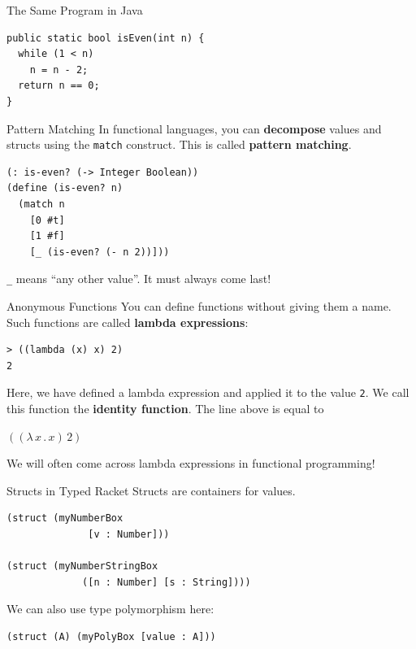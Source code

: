 \documentclass{beamer}
\begin{document}
\begin{frame}[fragile]{The Same Program in Java}
\begin{lstlisting}[style=Java]
public static bool isEven(int n) {
  while (1 < n)
    n = n - 2;
  return n == 0;
}
\end{lstlisting}
\end{frame}

\begin{frame}[fragile]{Pattern Matching}
In functional languages, you can \textbf{decompose} values and structs using the \lstinline{match} construct. This is called \textbf{pattern matching}.

\begin{lstlisting}
(: is-even? (-> Integer Boolean))
(define (is-even? n)
  (match n
    [0 #t]
    [1 #f]
    [_ (is-even? (- n 2))]))
\end{lstlisting}

\lstinline{_} means ``any other value''. It must always come last!
\end{frame}

\begin{frame}[fragile]{Anonymous Functions}
You can define functions without giving them a name. Such functions are called \textbf{lambda expressions}:

\begin{lstlisting}
> ((lambda (x) x) 2)
2
\end{lstlisting}

\pause{}

Here, we have defined a lambda expression and applied it to the value \lstinline{2}. We call this function  the \textbf{identity function}. The line above is equal to

\begin{center}
$((\lambda\, x\, .\, x)\, 2)$
\end{center}

\pause{}

\vspace{.5cm}

We will often come across lambda expressions in functional programming!
\end{frame}

\begin{frame}[fragile]{Structs in Typed Racket}
Structs are containers for values.

\begin{lstlisting}
(struct (myNumberBox
              [v : Number]))

(struct (myNumberStringBox
             ([n : Number] [s : String])))
\end{lstlisting}

\pause{}

We can also use type polymorphism here:

\begin{lstlisting}
(struct (A) (myPolyBox [value : A]))
\end{lstlisting}
\end{frame}
\end{document}
